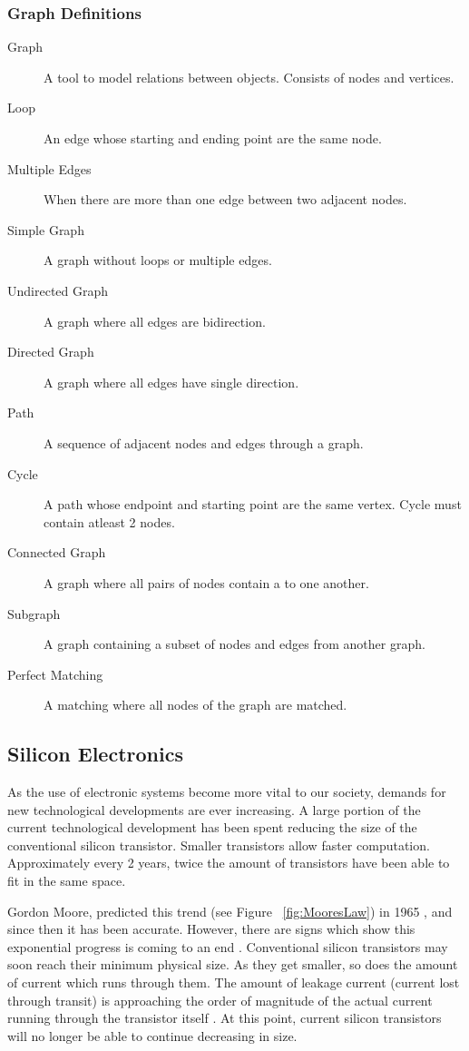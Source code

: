 \documentclass[12pt]{article}
\begin{document}
\subsubsection{Graph Definitions}

\begin{description}
\item[Graph] A tool to model relations between objects. Consists of nodes and vertices.
\item[Loop] An edge whose starting and ending point are the same node.
\item[Multiple Edges] When there are more than one edge between two adjacent nodes.
\item[Simple Graph] A graph without loops or multiple edges. 
\item[Undirected Graph] A graph where all edges are bidirection.
\item[Directed Graph] A graph where all edges have single direction.
\item[Path] A sequence of adjacent nodes and edges through a graph.
\item[Cycle] A path whose endpoint and starting point are the same vertex. Cycle must contain atleast 2 nodes.
\item[Connected Graph] A graph where all pairs of nodes contain a to one another.
\item[Subgraph] A graph containing a subset of nodes and edges from another graph.
\item[Perfect Matching] A matching where all nodes of the graph are matched.
\end{description}

\subsection{Silicon Electronics}

As the use of electronic systems become more vital to our society, demands for new technological developments are ever increasing. %
A large portion of the current technological development has been spent reducing the size of the conventional silicon transistor. Smaller transistors allow faster computation. Approximately every 2 years, twice the amount of transistors have been able to fit in the same space.

Gordon Moore, predicted this trend (see Figure ~\ref{fig:MooresLaw}) in 1965 \cite{Moore}, and since then it has been accurate. However, there are signs which show this exponential progress is coming to an end \cite{MooreEnd}. Conventional silicon transistors may soon reach their minimum physical size. As they get smaller, so does the amount of current which runs through them. The amount of leakage current (current lost through transit) is approaching the order of magnitude of the actual current running through the transistor itself \cite{v06}. At this point, current silicon transistors will no longer be able to continue decreasing in size.
\end{document}
